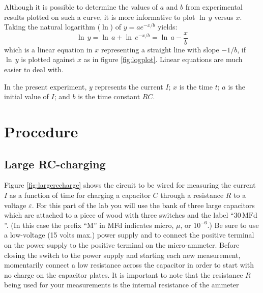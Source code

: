 Although it is possible to determine the values of $a$ and $b$ from experimental results plotted on such a curve, it is more informative to plot $\ln\,y$ versus $x$. Taking the natural logarithm ($\ln$) of $y=ae^{-x/b}$ yields:
\begin{equation}
    \ln\,y = \ln\,a + \ln\,e^{-x/b} = \ln\,a - \frac{x}{b}
    \label{eqn:logslope}
\end{equation}
which is a linear equation in $x$ representing a straight line with slope $-1/b$, if $\ln\,y$ is plotted against $x$ as in figure \ref{fig:logplot}. Linear equations are much easier to deal with. \myskip


In the present experiment, $y$ represents the current $I$; $x$ is the time $t$; $a$ is the initial value of $I$; and $b$ is the time constant $RC$. \myskip

\section{Procedure}

\subsection{Large RC-charging}

Figure \ref{fig:largerccharge} shows the circuit to be wired for measuring the current $I$ as a function of time for charging a capacitor $C$ through a resistance $R$ to a voltage $\varepsilon$. For this part of the lab you will use the bank of three large capacitors which are attached to a piece of wood with three switches and the label ``$30\,\mathrm{MFd}$''. (In this case the prefix ``M'' in MFd indicates micro, $\mu$, or $10^{-6}$.) Be sure to use a low-voltage (15 volts max.) power supply and to connect the positive terminal on the power supply to the positive terminal on the micro-ammeter. Before closing the switch to the power supply and starting each new measurement, momentarily connect a low resistance across the capacitor in order to start with no charge on the capacitor plates. It is important to note that the resistance $R$ being used for your measurements is the internal resistance of the ammeter\myskip

